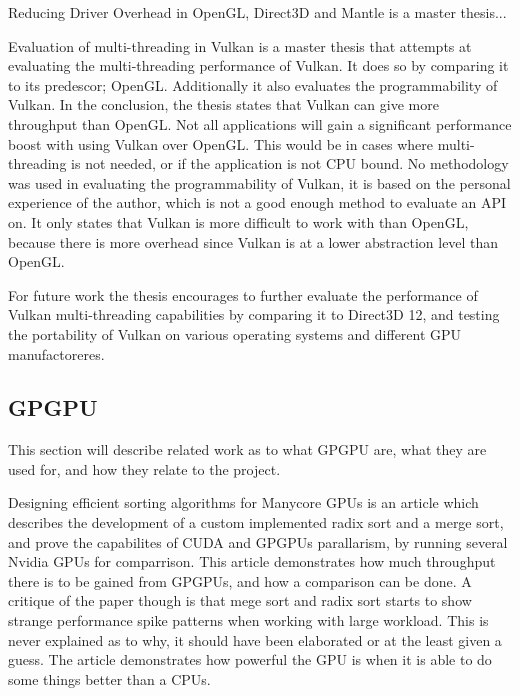 Reducing Driver Overhead in OpenGL, Direct3D and Mantle  \cite{dobersberger_2015_reducing} is a master thesis...

Evaluation of multi-threading in Vulkan \cite{blackert_2016_evaluation} is a master thesis that attempts at evaluating the multi-threading performance of Vulkan. It does so by comparing it to its predescor; OpenGL. 
Additionally it also evaluates the programmability of Vulkan. 
In the conclusion, the thesis states that Vulkan can give more throughput than OpenGL.
Not all applications will gain a significant performance boost with using Vulkan over OpenGL. 
This would be in cases where multi-threading is not needed, or if the application is not CPU bound. 
No methodology was used in evaluating the programmability of Vulkan, it is based on the personal experience of the author, which is not a good enough method to evaluate an \gls{API} on. 
It only states that Vulkan is more difficult to work with than OpenGL, because there is more overhead since Vulkan is at a lower abstraction level than OpenGL. 

For future work the thesis encourages to further evaluate the performance of Vulkan multi-threading  capabilities by comparing it to Direct3D 12, and testing the portability of Vulkan on various operating systems and different \gls{GPU} manufactoreres.

\subsection{\gls{GPGPU}}
This section will describe related work as to what GP\gls{GPU} are, what they are used for, and how they relate to the project.

Designing efficient sorting algorithms for Manycore \glspl{GPU} \cite{satish_2009_designing} is an article which describes the development of a custom implemented radix sort and a merge sort, and prove the capabilites of CUDA and \glspl{GPGPU} parallarism, by running several Nvidia \glspl{GPU} for comparrison. 
This article demonstrates how much throughput there is to be gained from \glspl{GPGPU}, and how a comparison can be done. 
A critique of the paper though is that mege sort and radix sort starts to show strange performance spike patterns when working with large workload. 
This is never explained as to why, it should have been elaborated or at the least given a guess.
The article demonstrates how powerful the \gls{GPU} is when it is able to do some things better than a \glspl{CPU}.


